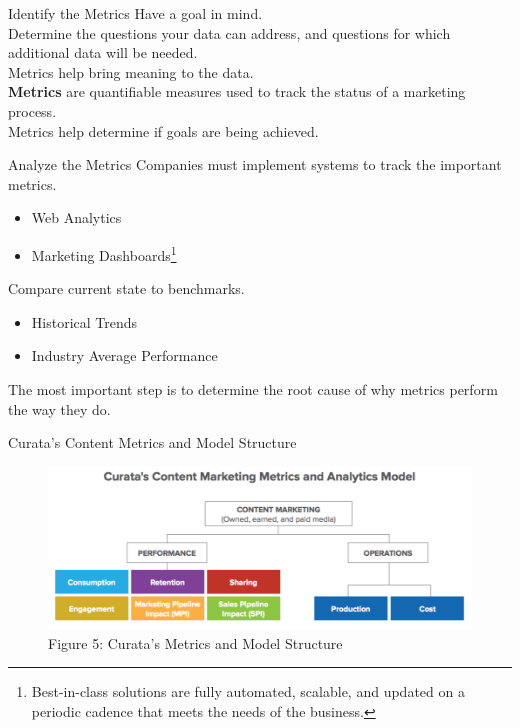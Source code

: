 \documentclass[pdf]{beamer}
\newcommand{\empr}[1]{{\color{franklinblue}\textbf{#1}}}
\theoremstyle{remark}
\theoremstyle{definition}
\begin{document}
\begin{frame}[t]{Identify the Metrics}
Have a goal in mind. \\
\vspace{1.5ex} 
Determine the questions your data can address, and questions for which additional data will be needed. \\
\vspace{1.5ex}  
Metrics help bring meaning to the data. \\
\vspace{1.5ex}
\empr{Metrics} are quantifiable measures used to track the status of a marketing process.\\
\vspace{1.5ex}
Metrics help determine if goals are being achieved.
\end{frame}

\begin{frame}[t]{Analyze the Metrics}
Companies must implement systems to track the important metrics.\\
\vspace{1.5ex}
\begin{itemize}
\item Web Analytics
\item Marketing Dashboards\footnote{Best-in-class solutions are fully automated, scalable, and updated on a periodic cadence that meets the needs of the business.}
\end{itemize}
Compare current state to benchmarks. \\
\vspace{1.5ex}
\begin{itemize}
\item Historical Trends
\item Industry Average Performance
\end{itemize}
The most important step is to determine the root cause of why metrics perform the way they do.
\end{frame}

\begin{frame}[t]{Curata's Content Metrics and Model Structure}
\begin{figure}[htbp]
    \centering
    \captionsetup{justification=centering}
    \includegraphics[clip, trim=0.0cm 0.0cm 0.0cm 0.0cm, width=1\textwidth]{Images/Figure_12_2.png}  
    \caption{Figure {\color{franklinblue} 5}:  Curata's Metrics and Model Structure}
    \label{fig:curata}
\end{figure} 
\end{frame}
\end{document}
